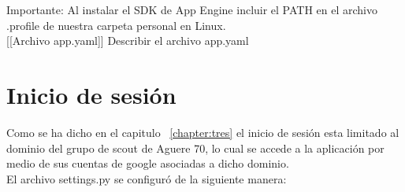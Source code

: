 Importante: Al instalar el SDK de App Engine incluir el PATH en el archivo .profile de nuestra carpeta personal en Linux.\\

[[Archivo app.yaml]]
Describir el archivo app.yaml

\section{Inicio de sesión}
\label{4:sec4}

Como se ha dicho en el capitulo ~\ref{chapter:tres} el inicio de sesión esta limitado al dominio del grupo de scout de Aguere 70, lo cual se accede a la aplicación
por medio de sus cuentas de google asociadas a dicho dominio.\\

El archivo settings.py se configuró de la siguiente manera:\\





